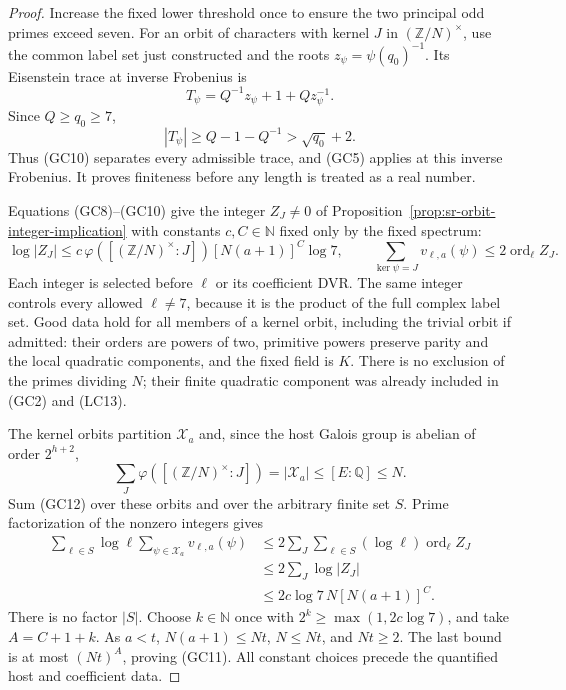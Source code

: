 \begin{proof}
Increase the fixed lower threshold once to
ensure the two principal odd primes exceed
seven.
For an orbit of characters with kernel \(J\)
in \((\mathbb Z/N)^\times\), use the common
label set just constructed and the roots
\(z_\psi=\psi(q_0)^{-1}\).
Its Eisenstein trace at inverse Frobenius is
\[
                 T_\psi=Q^{-1}z_\psi+1+Qz_\psi^{-1}.
\]
Since \(Q\ge q_0\ge7\),
\[
            |T_\psi|\ge Q-1-Q^{-1}>\sqrt{q_0}+2 .
\]
Thus (GC10) separates every admissible
trace, and (GC5) applies at this inverse
Frobenius. It proves finiteness before
any length is treated as a real number.

Equations (GC8)--(GC10) give the integer
\(Z_J\ne0\) of
Proposition~\ref{prop:sr-orbit-integer-implication}
with constants \(c,C\in\mathbb N\) fixed
only by the fixed spectrum:
\[
 \log|Z_J|\le
       c\,\varphi([(\mathbb Z/N)^\times:J])
                      [N(a+1)]^C\log7,\qquad
 \sum_{\ker\psi=J}v_{\ell,a}(\psi)
                            \le2\operatorname{ord}_\ell Z_J .
 \tag{GC12}
\]
Each integer is selected before \(\ell\) or
its coefficient DVR. The same integer controls
every allowed \(\ell\ne7\), because it is the
product of the full complex label set.
Good data hold for all members of a kernel
orbit, including the trivial orbit if admitted:
their orders are powers of two, primitive
powers preserve parity and the local quadratic
components, and the fixed field is \(K\).
There is no exclusion of the primes dividing
\(N\); their finite quadratic component was
already included in (GC2) and (LC13).

The kernel orbits partition \(\mathcal X_a\)
and, since the host Galois group is abelian
of order \(2^{h+2}\),
\[
       \sum_{J}\varphi([(\mathbb Z/N)^\times:J])
                    =|\mathcal X_a|
                    \le[E:\mathbb Q]\le N .
\]
Sum (GC12) over these orbits and over the
arbitrary finite set \(S\).
Prime factorization of the nonzero integers
gives
\[
 \begin{split}
 \sum_{\ell\in S}\log\ell\sum_{\psi\in\mathcal X_a}
                              v_{\ell,a}(\psi)
 &\le2\sum_J\sum_{\ell\in S}
                  (\log\ell)\operatorname{ord}_\ell Z_J\\
 &\le2\sum_J\log|Z_J|\\
 &\le2c\log7\,N[N(a+1)]^C .
 \end{split}
\]
There is no factor \(|S|\).
Choose \(k\in\mathbb N\) once with
\(2^k\ge\max(1,2c\log7)\), and take
\(A=C+1+k\).
As \(a<t\), \(N(a+1)\le Nt\), \(N\le Nt\),
and \(Nt\ge2\). The last bound is at most
\((Nt)^A\), proving (GC11).
All constant choices precede the quantified
host and coefficient data.
\end{proof}


